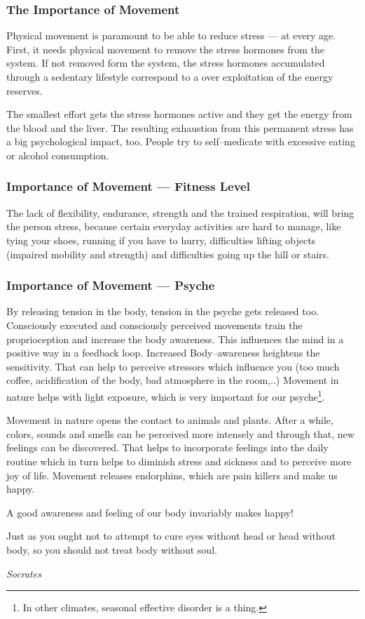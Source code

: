 \documentclass[../Book.Stress_regulation.tex]{subfiles}
\begin{document}
\subsubsection{The Importance of Movement}
Physical movement is paramount to be able to {reduce stress} --- at {every age}. First, it needs physical movement to {remove the stress hormones} from the system.
If not removed form the system, the {stress hormones accumulated} through a sedentary lifestyle correspond to a {over exploitation of the energy reserves}.

The {smallest effort gets the stress hormones active} and they get the energy from the blood and the liver.
The resulting {exhaustion} from this permanent stress has a big {psychological impact}, too.
People try to self--medicate with {excessive eating or alcohol consumption}.

\subsubsection{Importance of Movement --- Fitness Level}
The {lack of flexibility, endurance, strength and the trained respiration}, will bring the person {stress}, because certain everyday activities are hard to manage, like tying your shoes, running if you have to hurry, difficulties lifting objects (impaired mobility and strength) and difficulties going up the hill or stairs.

\subsubsection{Importance of Movement --- Psyche}
By {releasing tension in the body}, {tension in the psyche} gets released too.
 Consciously executed and consciously perceived movements train the {proprioception} and increase the body awareness. This influences the mind in a positive way in a feedback loop.
Increased Body--awareness heightens the sensitivity.
That can help to {perceive stressors} which influence you (too much coffee, acidification of the body, bad  atmosphere in the room,..)
Movement in nature helps with {light exposure}, which is very important for our psyche\footnote{In other climates, seasonal effective disorder is a thing.}.  

Movement in {nature} opens the contact to animals and plants. After a while, colors, sounds and smells can be {perceived more intensely} and through that, {new feelings} can be discovered.
That helps to {incorporate feelings} into the daily routine which in turn helps to diminish stress and sickness and to {perceive more joy of life}.
Movement releases {endorphins}, which are pain killers and make us happy.

{A good awareness and feeling of our body invariably makes {happy!}}

\epigraph{Just as you ought not to attempt to cure eyes without head or head without body, so you should not treat body without soul.
}{\textit{Socrates}}
\end{document}
